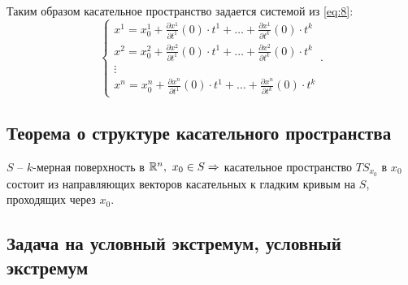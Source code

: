 \begin{definition}
    Таким образом касательное пространство задается системой из \ref{eq:8}:
    \[
        \left\{\begin{array}{l}
            x^1 = x^1_0 + \frac{\partial x^1}{\partial t^1} (0)\cdot t^1 + \ldots + \frac{\partial x^1}{\partial t^k}(0)\cdot t^k \\
            x^2 = x^2_0 + \frac{\partial x^2}{\partial t^1} (0)\cdot t^1 + \ldots + \frac{\partial x^2}{\partial t^k}(0)\cdot t^k \\
            \vdots                                                                                                                \\
            x^n = x^n_0 + \frac{\partial x^n}{\partial t^1} (0)\cdot t^1 + \ldots + \frac{\partial x^n}{\partial t^k}(0)\cdot t^k
        \end{array}\right..
    \]
\end{definition}

\newpage

\subsection{Теорема о структуре касательного пространства}

\begin{theorem}\label{theorem:2}
    $S$ -- $k$-мерная поверхность в $\mathbb{R}^n, \ x_0 \in S \Rightarrow $ касательное пространство $TS_{x_0}$ в $x_0$ состоит из направляющих векторов касательных к гладким кривым на $S$, проходящих через $x_0$.
\end{theorem}

\subsection{Задача на условный экстремум, условный экстремум}

